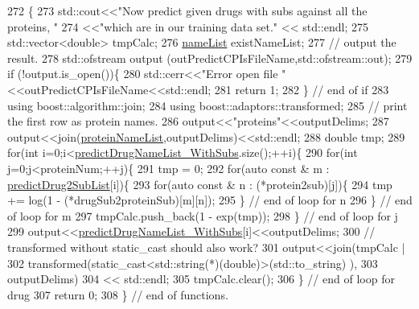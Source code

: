 \begin{DoxyCode}
272                               \{
273     std::cout<<\textcolor{stringliteral}{"Now predict given drugs with subs against all the proteins, "}
274              <<\textcolor{stringliteral}{"which are in our training data set."} << std::endl;
275     std::vector<double> tmpCalc;
276     \hyperlink{namespacegift_a62f85efaab3bff48335863ae0670c7a7}{nameList} existNameList;
277     \textcolor{comment}{// output the result.}
278     std::ofstream output (outPredictCPIsFileName,std::ofstream::out);
279     \textcolor{keywordflow}{if} (!output.is\_open())\{
280       std::cerr<<\textcolor{stringliteral}{"Error open file "}<<outPredictCPIsFileName<<std::endl;
281       \textcolor{keywordflow}{return} 1;
282     \} \textcolor{comment}{// end of if}
283     \textcolor{keyword}{using} boost::algorithm::join;
284     \textcolor{keyword}{using} boost::adaptors::transformed;
285     \textcolor{comment}{// print the first row as protein names.}
286     output<<\textcolor{stringliteral}{"proteins"}<<outputDelims;
287     output<<join(\hyperlink{namespacegift_ac03221463832a0531081c053ed10bafd}{proteinNameList},outputDelims)<<std::endl;
288     \textcolor{keywordtype}{double} tmp;
289     \textcolor{keywordflow}{for}(\textcolor{keywordtype}{int} i=0;i<\hyperlink{namespacegift_a85bd1982c5b60a7cf09a0f80398bb051}{predictDrugNameList\_WithSubs}.size();++i)\{
290       \textcolor{keywordflow}{for}(\textcolor{keywordtype}{int} j=0;j<proteinNum;++j)\{
291         tmp = 0;
292         \textcolor{keywordflow}{for}(\textcolor{keyword}{auto} \textcolor{keyword}{const} & m : \hyperlink{namespacegift_a00bda5cc17262f36063eed0fbf03459c}{predictDrug2SubList}[i])\{
293           \textcolor{keywordflow}{for}(\textcolor{keyword}{auto} \textcolor{keyword}{const} & n : (*protein2sub)[j])\{
294             tmp += log(1 - (*drugSub2proteinSub)[m][n]);
295           \} \textcolor{comment}{// end of loop for n}
296         \} \textcolor{comment}{// end of loop for m}
297         tmpCalc.push\_back(1 - exp(tmp));
298       \} \textcolor{comment}{// end of loop for j}
299       output<<\hyperlink{namespacegift_a85bd1982c5b60a7cf09a0f80398bb051}{predictDrugNameList\_WithSubs}[i]<<outputDelims;
300       \textcolor{comment}{// transformed without static\_cast should also work?}
301       output<<join(tmpCalc |
302               transformed(\textcolor{keyword}{static\_cast<}std::string(*)(\textcolor{keywordtype}{double})\textcolor{keyword}{>}(std::to\_string) ),
303                    outputDelims)
304             << std::endl;
305       tmpCalc.clear();
306     \} \textcolor{comment}{// end of loop for drug}
307     \textcolor{keywordflow}{return} 0;
308   \} \textcolor{comment}{// end of functions.}
\end{DoxyCode}
